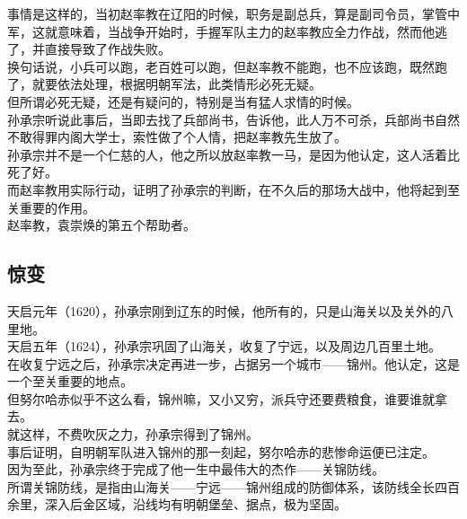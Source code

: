 \begin{multicols}{\theparacolNo}
事情是这样的，当初赵率教在辽阳的时候，职务是副总兵，算是副司令员，掌管中军，这就意味着，当战争开始时，手握军队主力的赵率教应全力作战，然而他逃了，并直接导致了作战失败。\\

换句话说，小兵可以跑，老百姓可以跑，但赵率教不能跑，也不应该跑，既然跑了，就要依法处理，根据明朝军法，此类情形必死无疑。\\

但所谓必死无疑，还是有疑问的，特别是当有猛人求情的时候。\\

孙承宗听说此事后，当即去找了兵部尚书，告诉他，此人万不可杀，兵部尚书自然不敢得罪内阁大学士，索性做了个人情，把赵率教先生放了。\\

孙承宗并不是一个仁慈的人，他之所以放赵率教一马，是因为他认定，这人活着比死了好。\\

而赵率教用实际行动，证明了孙承宗的判断，在不久后的那场大战中，他将起到至关重要的作用。\\

赵率教，袁崇焕的第五个帮助者。\\

\subsection{惊变}
天启元年（1620），孙承宗刚到辽东的时候，他所有的，只是山海关以及关外的八里地。\\

天启五年（1624），孙承宗巩固了山海关，收复了宁远，以及周边几百里土地。\\

在收复宁远之后，孙承宗决定再进一步，占据另一个城市——锦州。他认定，这是一个至关重要的地点。\\

但努尔哈赤似乎不这么看，锦州嘛，又小又穷，派兵守还要费粮食，谁要谁就拿去。\\

就这样，不费吹灰之力，孙承宗得到了锦州。\\

事后证明，自明朝军队进入锦州的那一刻起，努尔哈赤的悲惨命运便已注定。\\

因为至此，孙承宗终于完成了他一生中最伟大的杰作——关锦防线。\\

所谓关锦防线，是指由山海关——宁远——锦州组成的防御体系，该防线全长四百余里，深入后金区域，沿线均有明朝堡垒、据点，极为坚固。\\


\end{multicols}
